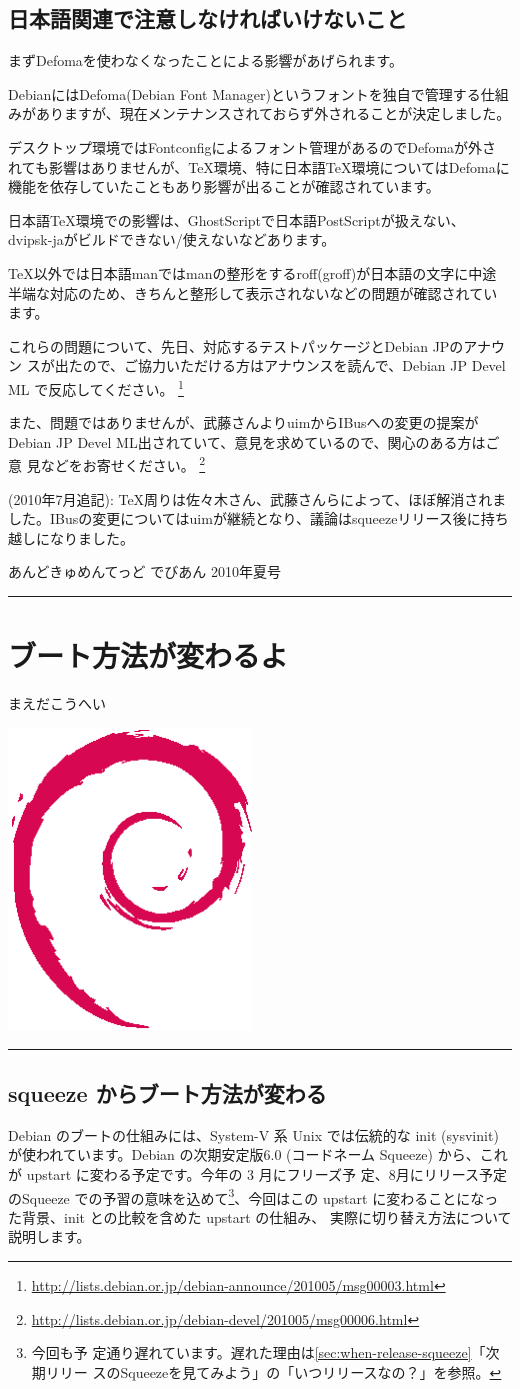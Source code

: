 \documentclass[mingoth,a4paper]{jsarticle}
\renewcommand{\dancersection}[2]{%
\newpage
あんどきゅめんてっど でびあん 2010年夏号
%
\vspace{0.1mm}\\
{\color{dancerlightblue}\rule{\hsize}{2mm}}

%
%
\begin{minipage}[t]{0.6\hsize}
\color{dancerdarkblue}
\vspace{1cm}
\section{#1}
\hfill{}#2\\
\end{minipage}
\begin{minipage}[t]{0.4\hsize}
\vspace{-2cm}
\hfill{}\includegraphics[height=8cm]{image200502/openlogo-nd.eps}\\
\vspace{-5cm}
\end{minipage}
%
%
{\color{dancerdarkblue}\rule{0.74\hsize}{2mm}}
%
\vspace{2cm}
}
\begin{document}
\subsection{日本語関連で注意しなければいけないこと}

まずDefomaを使わなくなったことによる影響があげられます。

DebianにはDefoma(Debian Font Manager)というフォントを独自で管理する仕組
みがありますが、現在メンテナンスされておらず外されることが決定しました。

デスクトップ環境ではFontconfigによるフォント管理があるのでDefomaが外さ
れても影響はありませんが、TeX環境、特に日本語TeX環境についてはDefomaに
機能を依存していたこともあり影響が出ることが確認されています。

日本語TeX環境での影響は、GhostScriptで日本語PostScriptが扱えない、
dvipsk-jaがビルドできない/使えないなどあります。

TeX以外では日本語manではmanの整形をするroff(groff)が日本語の文字に中途
半端な対応のため、きちんと整形して表示されないなどの問題が確認されてい
ます。

これらの問題について、先日、対応するテストパッケージとDebian JPのアナウン
スが出たので、ご協力いただける方はアナウンスを読んで、Debian JP Devel ML
で反応してください。
\footnote{\url{http://lists.debian.or.jp/debian-announce/201005/msg00003.html}}

また、問題ではありませんが、武藤さんよりuimからIBusへの変更の提案が
Debian JP Devel ML出されていて、意見を求めているので、関心のある方はご意
見などをお寄せください。
\footnote{\url{http://lists.debian.or.jp/debian-devel/201005/msg00006.html}}

(2010年7月追記): TeX周りは佐々木さん、武藤さんらによって、ほぼ解消されま
した。IBusの変更についてはuimが継続となり、議論はsqueezeリリース後に持ち
越しになりました。

\dancersection{ブート方法が変わるよ}{まえだこうへい}

\subsection{squeeze からブート方法が変わる}
Debian のブートの仕組みには、System-V 系 Unix では伝統的な init
(sysvinit) が使われています。Debian の次期安定版6.0 (コードネーム
Squeeze) から、これが upstart に変わる予定です。今年の 3 月にフリーズ予
定、8月にリリース予定のSqueeze での予習の意味を込めて\footnote{今回も予
定通り遅れています。遅れた理由は\ref{sec:when-release-squeeze}「次期リリー
スのSqueezeを見てみよう」の「いつリリースなの？」を参照。}、今回はこの
upstart に変わることになった背景、init との比較を含めた upstart の仕組み、
実際に切り替え方法について説明します。
\end{document}

